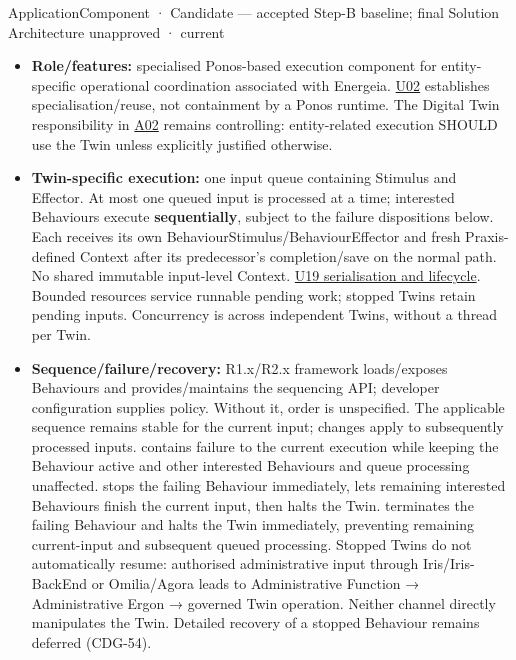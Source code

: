\label{element:3f64d339648246e99e8866c8089f8960}
{\small ApplicationComponent · Candidate — accepted Step-B baseline; final Solution Architecture unapproved · current}\par

\begin{itemize}


\item \textbf{Role/features:} specialised Ponos-based execution component for entity-specific
  operational coordination associated with Energeia. \href{\detokenize{../../../../../docs/markdown/05-information-systems-architecture/sources.md#u02}}{U02} establishes
  specialisation/reuse, not containment by a Ponos runtime. The Digital Twin
  responsibility in \href{\detokenize{../../../../../docs/markdown/05-information-systems-architecture/sources.md#a02}}{A02} remains controlling: entity-related
  execution SHOULD use the Twin unless explicitly justified otherwise.

\item \textbf{Twin-specific execution:} one input queue containing Stimulus and Effector.
  At most one queued input is processed at a time; interested Behaviours execute
  \textbf{sequentially}, subject to the failure dispositions below. Each receives its
  own BehaviourStimulus/BehaviourEffector and fresh Praxis-defined Context after
  its predecessor's completion/save on the normal path. No shared immutable
  input-level Context.
  \href{\detokenize{../../../../../docs/markdown/05-information-systems-architecture/design-notes/DesignNote-Digital-Twin-Behaviour-and-Execution-Semantics.md}}{U19 serialisation and lifecycle}.
  Bounded resources service runnable pending work; stopped Twins retain pending
  inputs. Concurrency is across independent Twins, without a thread per Twin.

\item \textbf{Sequence/failure/recovery:} R1.x/R2.x framework loads/exposes Behaviours and
  provides/maintains the sequencing API; developer configuration supplies policy.
  Without it, order is unspecified. The applicable sequence remains stable for
  the current input; changes apply to subsequently processed inputs.
  \texttt{} contains failure to the current execution while
  keeping the Behaviour active and other interested Behaviours and queue processing
  unaffected. \texttt{} stops the failing Behaviour immediately,
  lets remaining interested Behaviours finish the current input, then halts the
  Twin. \texttt{} terminates the failing Behaviour and halts the
  Twin immediately, preventing remaining current-input and subsequent queued
  processing. Stopped Twins do not
  automatically resume: authorised administrative input through Iris/Iris-BackEnd
  or Omilia/Agora leads to Administrative Function → Administrative Ergon →
  governed Twin operation. Neither channel directly manipulates the Twin.
  Detailed recovery of a stopped Behaviour remains deferred (CDG-54).


\end{itemize}
